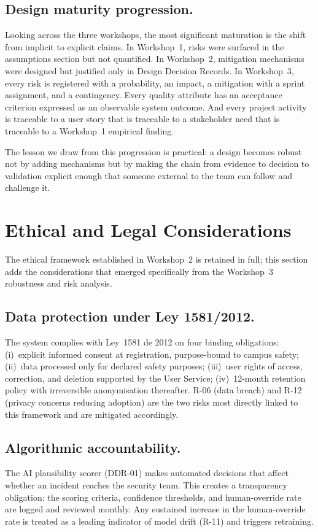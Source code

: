 \documentclass[12pt,a4paper]{article}
\begin{document}
\subsection{Design maturity progression.}
Looking across the three workshops, the most significant maturation
is the shift from implicit to explicit claims. In Workshop~1, risks
were surfaced in the assumptions section but not quantified. In
Workshop~2, mitigation mechanisms were designed but justified only
in Design Decision Records. In Workshop~3, every risk is registered
with a probability, an impact, a mitigation with a sprint assignment,
and a contingency. Every quality attribute has an acceptance criterion
expressed as an observable system outcome. And every project activity
is traceable to a user story that is traceable to a stakeholder need
that is traceable to a Workshop~1 empirical finding.

The lesson we draw from this progression is practical: a design
becomes robust not by adding mechanisms but by making the chain from
evidence to decision to validation explicit enough that someone
external to the team can follow and challenge it.

\section{Ethical and Legal Considerations}

The ethical framework established in Workshop~2 is retained in
full; this section adds the considerations that emerged specifically
from the Workshop~3 robustness and risk analysis.

\subsection{Data protection under Ley 1581/2012.}
The system complies with Ley~1581 de 2012 on four binding
obligations: (i)~explicit informed consent at registration,
purpose-bound to campus safety; (ii)~data processed only for
declared safety purposes; (iii)~user rights of access, correction,
and deletion supported by the User Service; (iv)~12-month retention
policy with irreversible anonymisation thereafter. R-06 (data breach)
and R-12 (privacy concerns reducing adoption) are the two risks most
directly linked to this framework and are mitigated accordingly.

\subsection{Algorithmic accountability.}
The AI plausibility scorer (DDR-01) makes automated decisions that
affect whether an incident reaches the security team. This creates
a transparency obligation: the scoring criteria, confidence thresholds,
and human-override rate are logged and reviewed monthly. Any
sustained increase in the human-override rate is treated as a
leading indicator of model drift (R-11) and triggers retraining.
\end{document}
